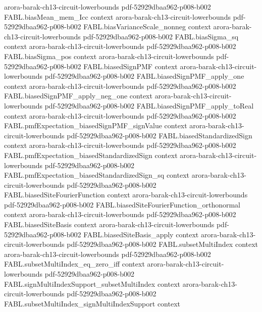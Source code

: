 \begin{theorem}
  {arora-barak-ch13-circuit-lowerbounds}
  {pdf-52929dbaa962-p008-b002}
\proofstep
  {FABL.biasMean_mem_Icc}
  {context}
  {arora-barak-ch13-circuit-lowerbounds}
  {pdf-52929dbaa962-p008-b002}
\proofstep
  {FABL.biasVarianceScale_nonneg}
  {context}
  {arora-barak-ch13-circuit-lowerbounds}
  {pdf-52929dbaa962-p008-b002}
\proofstep
  {FABL.biasSigma_sq}
  {context}
  {arora-barak-ch13-circuit-lowerbounds}
  {pdf-52929dbaa962-p008-b002}
\proofstep
  {FABL.biasSigma_pos}
  {context}
  {arora-barak-ch13-circuit-lowerbounds}
  {pdf-52929dbaa962-p008-b002}
\proofstep
  {FABL.biasedSignPMF}
  {context}
  {arora-barak-ch13-circuit-lowerbounds}
  {pdf-52929dbaa962-p008-b002}
\proofstep
  {FABL.biasedSignPMF_apply_one}
  {context}
  {arora-barak-ch13-circuit-lowerbounds}
  {pdf-52929dbaa962-p008-b002}
\proofstep
  {FABL.biasedSignPMF_apply_neg_one}
  {context}
  {arora-barak-ch13-circuit-lowerbounds}
  {pdf-52929dbaa962-p008-b002}
\proofstep
  {FABL.biasedSignPMF_apply_toReal}
  {context}
  {arora-barak-ch13-circuit-lowerbounds}
  {pdf-52929dbaa962-p008-b002}
\proofstep
  {FABL.pmfExpectation_biasedSignPMF_signValue}
  {context}
  {arora-barak-ch13-circuit-lowerbounds}
  {pdf-52929dbaa962-p008-b002}
\proofstep
  {FABL.biasedStandardizedSign}
  {context}
  {arora-barak-ch13-circuit-lowerbounds}
  {pdf-52929dbaa962-p008-b002}
\proofstep
  {FABL.pmfExpectation_biasedStandardizedSign}
  {context}
  {arora-barak-ch13-circuit-lowerbounds}
  {pdf-52929dbaa962-p008-b002}
\proofstep
  {FABL.pmfExpectation_biasedStandardizedSign_sq}
  {context}
  {arora-barak-ch13-circuit-lowerbounds}
  {pdf-52929dbaa962-p008-b002}
\proofstep
  {FABL.biasedSiteFourierFunction}
  {context}
  {arora-barak-ch13-circuit-lowerbounds}
  {pdf-52929dbaa962-p008-b002}
\proofstep
  {FABL.biasedSiteFourierFunction_orthonormal}
  {context}
  {arora-barak-ch13-circuit-lowerbounds}
  {pdf-52929dbaa962-p008-b002}
\proofstep
  {FABL.biasedSiteBasis}
  {context}
  {arora-barak-ch13-circuit-lowerbounds}
  {pdf-52929dbaa962-p008-b002}
\proofstep
  {FABL.biasedSiteBasis_apply}
  {context}
  {arora-barak-ch13-circuit-lowerbounds}
  {pdf-52929dbaa962-p008-b002}
\proofstep
  {FABL.subsetMultiIndex}
  {context}
  {arora-barak-ch13-circuit-lowerbounds}
  {pdf-52929dbaa962-p008-b002}
\proofstep
  {FABL.subsetMultiIndex_eq_zero_iff}
  {context}
  {arora-barak-ch13-circuit-lowerbounds}
  {pdf-52929dbaa962-p008-b002}
\proofstep
  {FABL.signMultiIndexSupport_subsetMultiIndex}
  {context}
  {arora-barak-ch13-circuit-lowerbounds}
  {pdf-52929dbaa962-p008-b002}
\proofstep
  {FABL.subsetMultiIndex_signMultiIndexSupport}
  {context}

\end{theorem}
